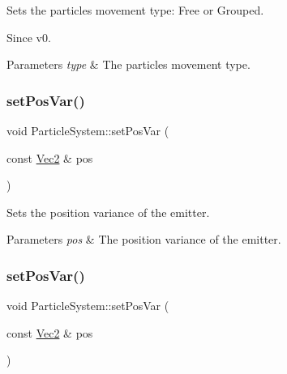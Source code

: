 Sets the particles movement type\+: Free or Grouped. \begin{DoxySince}{Since}
v0.
\end{DoxySince}

\begin{DoxyParams}{Parameters}
{\em type} & The particles movement type. \\
\hline
\end{DoxyParams}
\mbox{\label{classParticleSystem_aefe6eeaede73513fec84e21d1efbcb04}} 
\subsubsection{\texorpdfstring{set\+Pos\+Var()}{setPosVar()}\hspace{0.1cm}{\footnotesize\ttfamily [1/2]}}
{\footnotesize\ttfamily void Particle\+System\+::set\+Pos\+Var (\begin{DoxyParamCaption}\item[{const \hyperlink{classVec2}{Vec2} \&}]{pos }\end{DoxyParamCaption})\hspace{0.3cm}{\ttfamily [inline]}}

Sets the position variance of the emitter.


\begin{DoxyParams}{Parameters}
{\em pos} & The position variance of the emitter. \\
\hline
\end{DoxyParams}
\mbox{\label{classParticleSystem_aefe6eeaede73513fec84e21d1efbcb04}} 
\subsubsection{\texorpdfstring{set\+Pos\+Var()}{setPosVar()}\hspace{0.1cm}{\footnotesize\ttfamily [2/2]}}
{\footnotesize\ttfamily void Particle\+System\+::set\+Pos\+Var (\begin{DoxyParamCaption}\item[{const \hyperlink{classVec2}{Vec2} \&}]{pos }\end{DoxyParamCaption})\hspace{0.3cm}{\ttfamily [inline]}}

